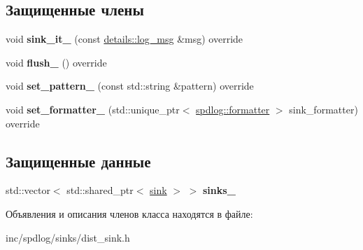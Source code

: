 \subsection*{Защищенные члены}
\begin{DoxyCompactItemize}
\item 
\mbox{\label{classspdlog_1_1sinks_1_1dist__sink_a516ef929a8cd73df2ead2e0086e04607}} 
void {\bfseries sink\+\_\+it\+\_\+} (const \hyperlink{structspdlog_1_1details_1_1log__msg}{details\+::log\+\_\+msg} \&msg) override
\item 
\mbox{\label{classspdlog_1_1sinks_1_1dist__sink_a790a80f63276473cedbce99047adcab0}} 
void {\bfseries flush\+\_\+} () override
\item 
\mbox{\label{classspdlog_1_1sinks_1_1dist__sink_a6f77a1e2f45ed85ee8ed554cf7442d4e}} 
void {\bfseries set\+\_\+pattern\+\_\+} (const std\+::string \&pattern) override
\item 
\mbox{\label{classspdlog_1_1sinks_1_1dist__sink_a5e83e285fcceaab7ee4c4736c2decef0}} 
void {\bfseries set\+\_\+formatter\+\_\+} (std\+::unique\+\_\+ptr$<$ \hyperlink{classspdlog_1_1formatter}{spdlog\+::formatter} $>$ sink\+\_\+formatter) override
\end{DoxyCompactItemize}
\subsection*{Защищенные данные}
\begin{DoxyCompactItemize}
\item 
\mbox{\label{classspdlog_1_1sinks_1_1dist__sink_a3d9d8c330d7d6455f45db77d4e6977f4}} 
std\+::vector$<$ std\+::shared\+\_\+ptr$<$ \hyperlink{classspdlog_1_1sinks_1_1sink}{sink} $>$ $>$ {\bfseries sinks\+\_\+}
\end{DoxyCompactItemize}


Объявления и описания членов класса находятся в файле\+:\begin{DoxyCompactItemize}
\item 
inc/spdlog/sinks/dist\+\_\+sink.\+h\end{DoxyCompactItemize}
